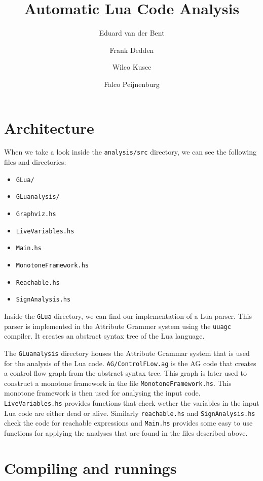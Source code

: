 \documentclass[10pt]{article}
\title{Automatic Lua Code Analysis}
\author{Eduard van der Bent \and Frank Dedden \and Wilco Kusee \and Falco Peijnenburg}
\begin{document}
\maketitle


\section{Architecture}
When we take a look inside the \texttt{analysis/src} directory, we can see the following files and directories:
\begin{itemize}
	\item \texttt{GLua/}
	\item \texttt{GLuanalysis/}
	\item \texttt{Graphviz.hs}
	\item \texttt{LiveVariables.hs}
	\item \texttt{Main.hs}
	\item \texttt{MonotoneFramework.hs}
	\item \texttt{Reachable.hs}
	\item \texttt{SignAnalysis.hs}
\end{itemize}

Inside the \texttt{GLua} directory, we can find our implementation of a Lua parser. This parser is implemented in the Attribute Grammer system using the \texttt{uuagc} compiler. It creates an abstract syntax tree of the Lua language. %

The \texttt{GLuanalysis} directory houses the Attribute Grammar system that is used for the analysis of the Lua code. \texttt{AG/ControlFLow.ag} is the AG code that creates a control flow graph from the abstract syntax tree. This graph is later used to construct a monotone framework in the file \texttt{MonotoneFramework.hs}. This monotone framework is then used for analysing the input code. \texttt{LiveVariables.hs} provides functions that check wether the variables in the input Lua code are either dead or alive. Similarly \texttt{reachable.hs} and \texttt{SignAnalysis.hs} check the code for reachable expressions and %
\texttt{Main.hs} provides some easy to use functions for applying the analyses that are found in the files described above.

\section{Compiling and runnings}
\end{document}
